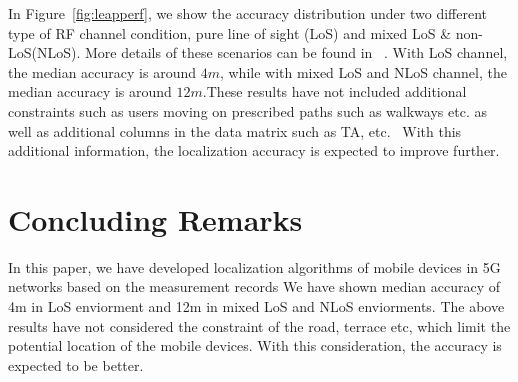 \documentclass[conference, 10pt]{IEEEtran}
\begin{document}
In Figure~\ref{fig:leapperf}, we show the
accuracy distribution under two different type of RF channel condition, pure line of sight (LoS) and mixed LoS \& non-LoS(NLoS). More details of these scenarios can be found in 
~\cite{3gpp38901}. With LoS channel, the median accuracy is around
$4m$, while with mixed LoS and NLoS channel, the median accuracy is around $12m$.These results have not included additional constraints such as users moving on prescribed paths such as walkways etc. as well as additional columns in the data matrix such as TA, etc. 
With this additional information, the localization accuracy is expected to improve further.

\section{Concluding Remarks}
\label{sec:concl}

In this paper, we have developed localization algorithms of mobile devices in 5G networks based on the measurement records 
We have shown median accuracy of 4m in LoS enviorment and 12m in mixed LoS and NLoS enviorments. 
The above results have not considered the constraint of the road, terrace etc, which limit the potential location of the mobile devices. With this consideration,
the accuracy is expected to be better.  




%
%    

{%


}
\end{document}
